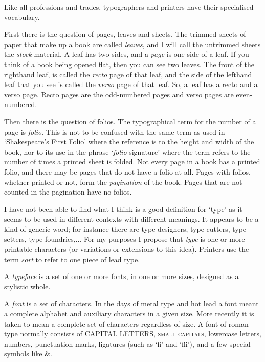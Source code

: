 \documentclass[10pt,a4paper,extrafontsizes]{memoir}
\begin{document}
    Like all professions and trades, typographers and printers have their
specialised vocabulary.

    First there is the question of pages, leaves and sheets. 
The trimmed sheets of paper that make up a book are called 
\emph{leaves},
and I will call the untrimmed sheets the \emph{stock} material. 
A leaf
has two sides, and a \emph{page} is one side of a leaf. 
If you think of a book
being opened flat, then you can see two leaves. The front of the righthand
leaf, is called the \emph{recto} page of that leaf, 
and the side of the
lefthand leaf that you see is called the \emph{verso} page 
of that leaf. 
So, a leaf has a recto and a verso page. Recto pages are the odd-numbered 
pages and verso pages are even-numbered.

   Then there is the question of folios. The typographical term for
the number of a page is \emph{folio}.
This is not to be confused with
the same term as used in `Shakespeare's First Folio' where the reference is
to the height and width of the book, nor to its use in the phrase
`\emph{folio} signature' where the term refers to the 
number of times a printed sheet is folded. 
Not every page in a book has a printed
folio, and there may be pages that do not have a folio at all. Pages with
folios, whether printed or not, form the \emph{pagination} 
of the book. Pages
that are not counted in the pagination have no folios.

 I have not been able to find what I think is a good
definition for `type' as it seems to be used in different contexts with
different meanings. It appears to be a kind of generic word; for instance
there are type designers, type cutters, type setters, type foundries,...
For my purposes I propose that \emph{type} is 
one or more printable characters (or variations or extensions to this idea).  
Printers use the term \emph{sort} to refer to one piece of lead
type.

   A \emph{typeface} is a set of one or more fonts, in one
or more sizes, designed as a stylistic whole. 

   A \emph{font} is a set of characters. In the days of 
metal type and hot lead a font meant a complete alphabet and auxiliary
characters in a given size. More recently it is taken to mean a complete
set of characters regardless of size. A font of roman type normally
consists of CAPITAL LETTERS, \textsc{small capitals}, lowercase letters,
numbers, punctuation marks, ligatures (such as `fi' and `ffi'), and a
few special symbols like \&.
\end{document}
